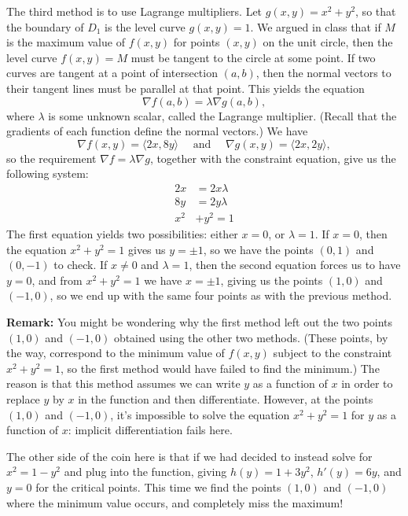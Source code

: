 \documentclass[12pt,letterpaper]{article}
\begin{document}
The third method is to use Lagrange multipliers. Let $g(x,y)=x^2+y^2$, so that the boundary of $D_1$ is the level curve $g(x,y)=1$. We argued in class that if $M$ is the maximum value of $f(x,y)$ for points $(x,y)$ on the unit circle, then the level curve $f(x,y)=M$ must be tangent to the circle at some point. If two curves are tangent at a point of intersection $(a,b)$, then the normal vectors to their tangent lines must be parallel at that point. This yields the equation
\[
 \nabla f(a,b) = \lambda \nabla g(a,b),
\]
where $\lambda$ is some unknown scalar, called the Lagrange multiplier. (Recall that the gradients of each function define the normal vectors.) We have 
\[
 \nabla f(x,y) = \langle 2x, 8y\rangle \quad \text{ and } \quad \nabla g(x,y) = \langle 2x, 2y\rangle,
\]
so the requirement $\nabla f = \lambda \nabla g$, together with the constraint equation, give us the following system:
\begin{align*}
 2x& = 2x\lambda\\
 8y& = 2y\lambda\\
 x^2&+y^2 = 1
\end{align*}
The first equation yields two possibilities: either $x=0$, or $\lambda=1$. If $x=0$, then the equation $x^2+y^2=1$ gives us $y=\pm 1$, so we have the points $(0,1)$ and $(0,-1)$ to check. If $x\neq 0$ and $\lambda = 1$, then the second equation forces us to have $y=0$, and from $x^2+y^2=1$ we have $x=\pm 1$, giving us the points $(1,0)$ and $(-1,0)$, so we end up with the same four points as with the previous method.

\bigskip

{\bf Remark:} You might be wondering why the first method left out the two points $(1,0)$ and $(-1,0)$ obtained using the other two methods. (These points, by the way, correspond to the minimum value of $f(x,y)$ subject to the constraint $x^2+y^2=1$, so the first method would have failed to find the minimum.) The reason is that this method assumes we can write $y$ as a function of $x$ in order to replace $y$ by $x$ in the function and then differentiate. However, at the points $(1,0)$ and $(-1,0)$, it's impossible to solve the equation $x^2+y^2=1$ for $y$ as a function of $x$: implicit differentiation fails here. 

The other side of the coin here is that if we had decided to instead solve for $x^2=1-y^2$ and plug into the function, giving $h(y) = 1+3y^2$, $h'(y)=6y$, and $y=0$ for the critical points. This time we find the points $(1,0)$ and $(-1,0)$ where the minimum value occurs, and completely miss the maximum!
\end{document}
